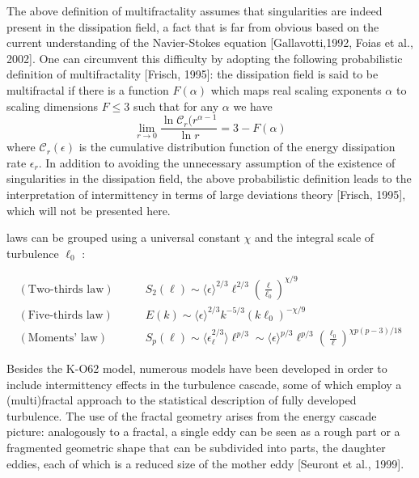 The above definition of multifractality assumes that singularities are indeed present in the dissipation field, a fact that is far from obvious based on the current understanding of the Navier-Stokes equation [Gallavotti,1992, Foias et al., 2002]. One can circumvent this difficulty by adopting the following probabilistic definition of multifractality [Frisch, 1995]: the dissipation field is said to be multifractal if there is a function $F(\alpha)$
which maps real scaling exponents $\alpha$ to scaling dimensions $F \leq 3$ such that for any $\alpha$ we have
\begin{equation}
    \lim_{r\rightarrow0}\frac{\ln\mathcal{C}_r(r^{\alpha-1}}{\ln r}=3-F(\alpha)
\end{equation}
where $\mathcal{C}_r(\epsilon)$ is the cumulative distribution function of the energy dissipation rate $\epsilon_r$. In addition to avoiding the unnecessary assumption of the existence of singularities in the dissipation field, the above probabilistic definition leads to the interpretation of intermittency in terms of large deviations theory [Frisch, 1995], which will not be presented here.

 laws can be grouped using a universal constant $\chi$ and the integral scale of turbulence $\ell_0$ :\begin{fullwidth}
\begin{align}
    (\text{Two-thirds law})\quad\quad&S_2(\ell)\sim\langle\epsilon\rangle^{2/3}\ell^{2/3}\left(\frac{\ell}{\ell_0}\right)^{\chi/9}\\
    (\text{Five-thirds law})\quad\quad&E(k)\sim\langle\epsilon\rangle^{2/3}k^{-5/3}(k\ell_0)^{-\chi/9}\\
    (\text{Moments' law})\quad\quad&S_p(\ell)\sim\langle\epsilon_\ell^{2/3}\rangle\ell^{p/3}\sim\langle\epsilon\rangle^{p/3}\ell^{p/3}\left(\frac{\ell_0}{\ell}\right)^{\chi p(p-3)/18}
\end{align}
\end{fullwidth}
Besides the K-O62 model, numerous models have been developed in order to include intermittency effects in the turbulence cascade, some of which employ a (multi)fractal approach to the statistical description of fully developed turbulence. The use of the fractal geometry arises from the energy cascade picture: analogously to a fractal, a single eddy can be seen as a rough
part or a fragmented geometric shape that can be subdivided into parts, the daughter eddies, each of which is a reduced size of the mother eddy [Seuront et al., 1999]. 

